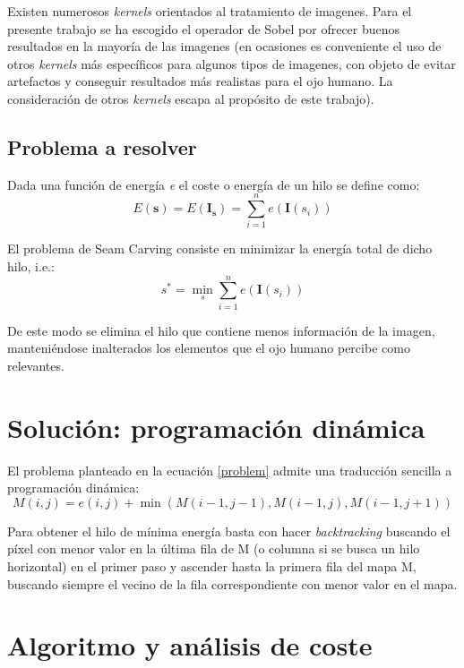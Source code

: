 \documentclass[11pt,a4paper,oneside]{article}
\begin{document}
Existen numerosos \textit{kernels} orientados al tratamiento de imagenes. Para el presente
trabajo se ha escogido el operador de Sobel por ofrecer buenos resultados en la mayoría de
las imagenes (en ocasiones es conveniente el uso de otros \textit{kernels} más específicos
para algunos tipos de imagenes, con objeto de evitar artefactos y conseguir resultados
más realistas para el ojo humano. La consideración de otros \textit{kernels} escapa al 
propósito de este trabajo).

\subsection{Problema a resolver}
Dada una función de energía \textit{e} el coste o energía de un hilo se define como:
\begin{equation}
    E(\textbf{s}) = E(\textbf{I}_\textbf{s}) = \sum_{i=1}^n e(\textbf{I}(s_i))
\end{equation}

El problema de Seam Carving consiste en minimizar la energía total de dicho hilo, i.e.:
\begin{equation}
    s^* = \min_s \sum_{i=1}^n e(\textbf{I}(s_i))
    \label{problem}
\end{equation}

De este modo se elimina el hilo que contiene menos información de la imagen, manteniéndose
inalterados los elementos que el ojo humano percibe como relevantes.

\section{Solución: programación dinámica}
El problema planteado en la ecuación \ref{problem} admite una traducción sencilla a programación 
dinámica:
\begin{equation}
    M(i,j) = e(i,j) + \min (M(i-1, j-1), M(i-1,j), M(i-1, j+1))
\end{equation}

Para obtener el hilo de mínima energía basta con hacer \textit{backtracking} buscando el 
píxel con menor valor en la última fila de M (o columna si se busca un hilo horizontal)
en el primer paso y ascender hasta la primera fila del mapa M, buscando siempre el vecino
de la fila correspondiente con menor valor en el mapa.

\section{Algoritmo y análisis de coste}
\end{document}
